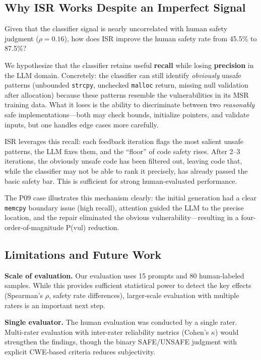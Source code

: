 \documentclass[sigconf,10pt]{acmart}
\begin{document}
\subsection{Why ISR Works Despite an Imperfect Signal}

Given that the classifier signal is nearly uncorrelated with human safety judgment ($\rho=0.16$), how does ISR improve the human safety rate from 45.5\% to 87.5\%?

We hypothesize that the classifier retains useful \textbf{recall} while losing \textbf{precision} in the LLM domain. Concretely: the classifier can still identify \textit{obviously} unsafe patterns (unbounded \texttt{strcpy}, unchecked \texttt{malloc} return, missing null validation after allocation) because these patterns resemble the vulnerabilities in its MSR training data. What it loses is the ability to discriminate between two \textit{reasonably} safe implementations---both may check bounds, initialize pointers, and validate inputs, but one handles edge cases more carefully.

ISR leverages this recall: each feedback iteration flags the most salient unsafe patterns, the LLM fixes them, and the ``floor'' of code safety rises. After 2--3 iterations, the obviously unsafe code has been filtered out, leaving code that, while the classifier may not be able to rank it precisely, has already passed the basic safety bar. This is sufficient for strong human-evaluated performance.

The P09 case illustrates this mechanism clearly: the initial generation had a clear \texttt{memcpy} boundary issue (high recall), attention guided the LLM to the precise location, and the repair eliminated the obvious vulnerability---resulting in a four-order-of-magnitude P(vul) reduction.

\subsection{Limitations and Future Work}

\textbf{Scale of evaluation.} Our evaluation uses 15 prompts and 80 human-labeled samples. While this provides sufficient statistical power to detect the key effects (Spearman's $\rho$, safety rate differences), larger-scale evaluation with multiple raters is an important next step.

\textbf{Single evaluator.} The human evaluation was conducted by a single rater. Multi-rater evaluation with inter-rater reliability metrics (Cohen's $\kappa$) would strengthen the findings, though the binary SAFE/UNSAFE judgment with explicit CWE-based criteria reduces subjectivity.
\end{document}

